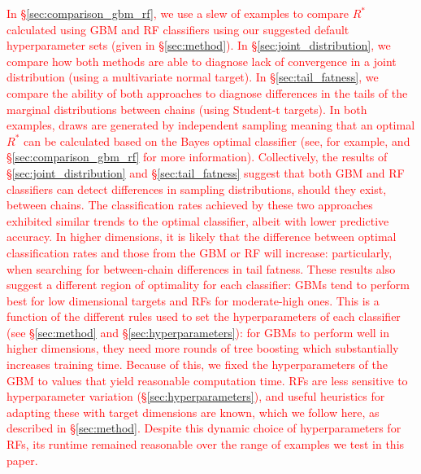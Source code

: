 \documentclass{article}
\begin{document}
\textcolor{red}{In \S\ref{sec:comparison_gbm_rf}, we use a slew of examples to compare $R^*$ calculated using GBM and RF classifiers using our suggested default hyperparameter sets (given in \S\ref{sec:method}). In \S\ref{sec:joint_distribution}, we compare how both methods are able to diagnose lack of convergence in a joint distribution (using a multivariate normal target). In \S\ref{sec:tail_fatness}, we compare the ability of both approaches to diagnose differences in the tails of the marginal distributions between chains (using Student-t targets). In both examples, draws are generated by independent sampling meaning that an optimal $R^*$ can be calculated based on the Bayes optimal classifier (see, for example, \citep{devroye2013probabilistic} and \S\ref{sec:comparison_gbm_rf} for more information). Collectively, the results of \S\ref{sec:joint_distribution} and \S\ref{sec:tail_fatness} suggest that both GBM and RF classifiers can detect differences in sampling distributions, should they exist, between chains. The classification rates achieved by these two approaches exhibited similar trends to the optimal classifier, albeit with lower predictive accuracy. In higher dimensions, it is likely that the difference between optimal classification rates and those from the GBM or RF will increase: particularly, when searching for between-chain differences in tail fatness. These results also suggest a different region of optimality for each classifier: GBMs tend to perform best for low dimensional targets and RFs for moderate-high ones. This is a function of the different rules used to set the hyperparameters of each classifier (see \S\ref{sec:method} and \S\ref{sec:hyperparameters}): for GBMs to perform well in higher dimensions, they need more rounds of tree boosting which substantially increases training time. Because of this, we fixed the hyperparameters of the GBM to values that yield reasonable computation time. RFs are less sensitive to hyperparameter variation (\S\ref{sec:hyperparameters}), and useful heuristics for adapting these with target dimensions are known, which we follow here, as described in \S\ref{sec:method}. Despite this dynamic choice of hyperparameters for RFs, its runtime remained reasonable over the range of examples we test in this paper.}
\end{document}
